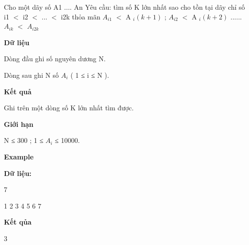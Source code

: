 



     Cho một  dãy số A1 .... An Yêu cầu: tìm số K lớn nhất sao cho tồn tại dãy chỉ số i1 $<$ i2 $<$ ... $<$ i2k thỏa mãn $A_{i1}$     $<$ A     $_      i( k + 1 )     $     ; $A_{i2}$     $<$ A     $_      i( k + 2 )     $     ...... $A_{ik}$     $<$ $A_{i2k}$

\textbf{      Dữ liệu     }

     Dòng đầu ghi số nguyên dương N.    

     Dòng sau ghi N số $A_{i}$     ( 1 ≤ i ≤ N ).    

\textbf{       Kết quả      }




     Ghi trên một dòng số K lớn nhất tìm được.    

\textbf{      Giới hạn     }

     N ≤ 300 ; 1 ≤ $A_{i}$     ≤ 10000.     




\textbf{      Example     }

\textbf{      Dữ liệu:     }

     7    

     1 2 3 4 5 6 7    

\textbf{      Kết qủa     }

     3    
